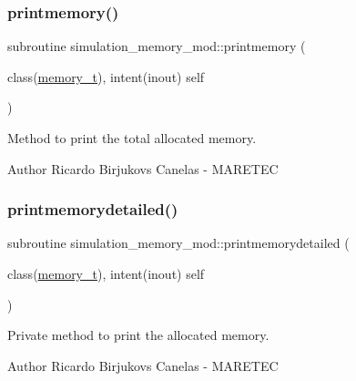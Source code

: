 \subsubsection{\texorpdfstring{printmemory()}{printmemory()}}
{\footnotesize\ttfamily subroutine simulation\+\_\+memory\+\_\+mod\+::printmemory (\begin{DoxyParamCaption}\item[{class(\hyperlink{structsimulation__memory__mod_1_1memory__t}{memory\+\_\+t}), intent(inout)}]{self }\end{DoxyParamCaption})\hspace{0.3cm}{\ttfamily [private]}}



Method to print the total allocated memory. 

\begin{DoxyAuthor}{Author}
Ricardo Birjukovs Canelas -\/ M\+A\+R\+E\+T\+EC 
\end{DoxyAuthor}
\mbox{\label{namespacesimulation__memory__mod_a894bd4ec7462fd634d328ee5be4c6483}} 
\subsubsection{\texorpdfstring{printmemorydetailed()}{printmemorydetailed()}}
{\footnotesize\ttfamily subroutine simulation\+\_\+memory\+\_\+mod\+::printmemorydetailed (\begin{DoxyParamCaption}\item[{class(\hyperlink{structsimulation__memory__mod_1_1memory__t}{memory\+\_\+t}), intent(inout)}]{self }\end{DoxyParamCaption})\hspace{0.3cm}{\ttfamily [private]}}



Private method to print the allocated memory. 

\begin{DoxyAuthor}{Author}
Ricardo Birjukovs Canelas -\/ M\+A\+R\+E\+T\+EC 
\end{DoxyAuthor}
\mbox{\label{namespacesimulation__memory__mod_a5f95539e9740401e7046b79c40ad2ecd}} 
